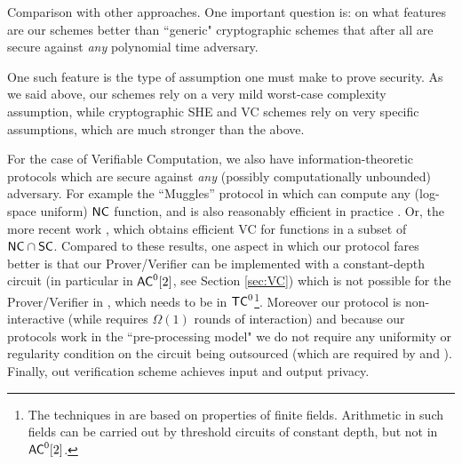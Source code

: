\medskip
\noindent
{\sc Comparison with other approaches.}
One important question is: on what features are our schemes better than ``generic" cryptographic schemes that after all are secure against {\em any} polynomial time  adversary. 

One such feature is the type of assumption one must make to prove security. As we said above, our schemes rely on a very mild worst-case complexity assumption, while cryptographic SHE and VC schemes rely on very specific assumptions, which are much stronger than the above. 

For the case of Verifiable Computation, we also have information-theoretic
protocols which are secure against {\em any} (possibly computationally unbounded) adversary. For example the ``Muggles'' protocol in \cite{muggles} which 
can compute any (log-space uniform) ${\mathsf{NC}}$ function, 
and is also reasonably efficient
in practice \cite{CMT}.
Or, the more recent work \cite{grlocally}, which obtains efficient VC for functions in a subset of ${\mathsf{NC}} \cap {\ensuremath{\mathsf{SC}}}$.
Compared to these results, one aspect in which our protocol fares better  is that
our Prover/Verifier can be implemented with a constant-depth circuit (in particular in 
${\mathsf{AC}}^0[2]$, see Section \ref{sec:VC}) which is not possible for the Prover/Verifier in \cite{muggles,grlocally}, which needs to be in ${\mathsf{TC}}^0$\footnote{The techniques in  \cite{muggles,grlocally} are based on properties of finite fields. Arithmetic in such fields can be carried out by threshold circuits of constant depth, but not in ${\mathsf{AC}}^0[2]$.}. Moreover our protocol is non-interactive (while \cite{muggles,grlocally} requires
$\Omega(1)$ rounds of interaction) and because our protocols work in the ``pre-processing model" we do not require any uniformity or regularity condition on the circuit being outsourced (which are required by \cite{muggles} and \cite{CMT}). Finally, out verification scheme achieves input and output privacy.


